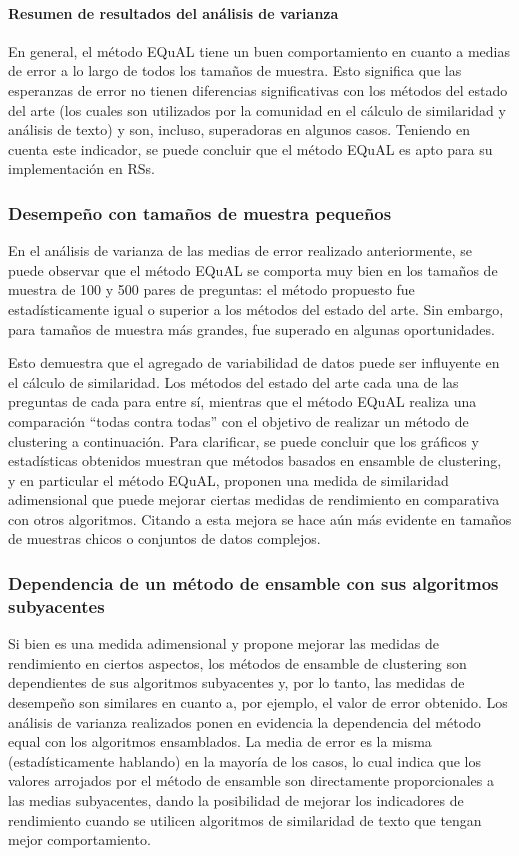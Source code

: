 \bigskip
\paragraph{Resumen de resultados del análisis de varianza}
En general, el método EQuAL tiene un buen comportamiento en cuanto a medias de error a lo largo de todos los tamaños de muestra. Esto significa que las esperanzas de error no tienen diferencias significativas con los métodos del estado del arte (los cuales son utilizados por la comunidad en el cálculo de similaridad y análisis de texto) y son, incluso, superadoras en algunos casos. Teniendo en cuenta este indicador, se puede concluir que el método EQuAL es apto para su implementación en RSs.

\subsubsection{Desempeño con tamaños de muestra pequeños}
En el análisis de varianza de las medias de error realizado anteriormente, se puede observar que el método EQuAL se comporta muy bien en los tamaños de muestra de 100 y 500 pares de preguntas: el método propuesto fue estadísticamente igual o superior a los métodos del estado del arte. Sin embargo, para tamaños de muestra más grandes, fue superado en algunas oportunidades.

\bigskip Esto demuestra que el agregado de variabilidad de datos puede ser influyente en el cálculo de similaridad. Los métodos del estado del arte cada una de las preguntas de cada para entre sí, mientras que el método EQuAL realiza una comparación “todas contra todas” con el objetivo de realizar un método de clustering a continuación. Para clarificar, se puede concluir que los gráficos y estadísticas obtenidos muestran que métodos basados en ensamble de clustering, y en particular el método EQuAL,  proponen una medida de similaridad adimensional que puede mejorar ciertas medidas de rendimiento en comparativa con otros algoritmos. Citando a \cite{fred2005combining} esta mejora se hace aún más evidente en tamaños de muestras chicos o conjuntos de datos complejos.

\subsubsection{Dependencia de un método de ensamble con sus algoritmos subyacentes}
Si bien es una medida adimensional y propone mejorar las medidas de rendimiento en ciertos aspectos, los métodos de ensamble de clustering son dependientes de sus algoritmos subyacentes y, por lo tanto, las medidas de desempeño son similares en cuanto a, por ejemplo, el valor de error obtenido. Los análisis de varianza realizados ponen en evidencia la dependencia del método equal con los algoritmos ensamblados. La media de error es la misma (estadísticamente hablando) en la mayoría de los casos, lo cual indica que los valores arrojados por el método de ensamble son directamente proporcionales a las medias subyacentes, dando la posibilidad de mejorar los indicadores de rendimiento cuando se utilicen algoritmos de similaridad de texto que tengan mejor comportamiento.

